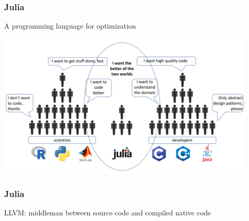 \documentclass[]{beamer}
\begin{document}
% 
%
\begin{frame}[fragile]
  \frametitle{Julia}
 \vspace{2mm}

A programming language for optimization
 \hspace{-5mm}
  {\centerline{\includegraphics[width=12.5cm]{twolanguage4.png}}}

\end{frame}

% 
%
\begin{frame}[fragile]
  \frametitle{Julia}
 \vspace{2mm}

LLVM: middleman between source code and compiled native code
 \hspace{-5mm}
\end{frame}
\end{document}
